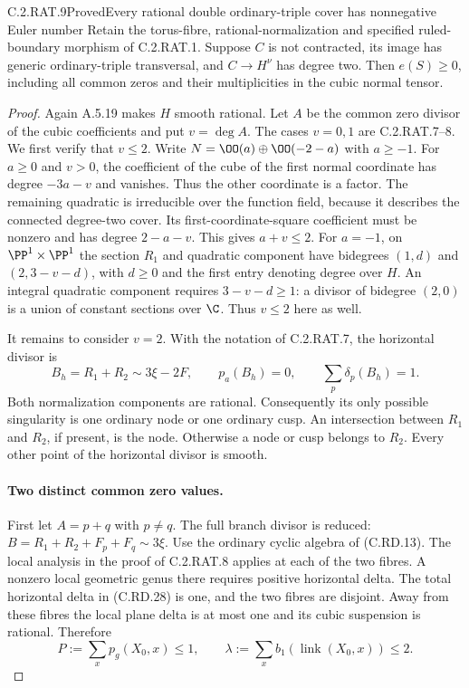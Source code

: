 \begin{statement}{C.2.RAT.9}{Proved}{Every rational double ordinary-triple cover has nonnegative Euler number}
Retain the torus-fibre, rational-normalization and specified
ruled-boundary morphism of C.2.RAT.1. Suppose $C$ is not
contracted, its image has generic ordinary-triple transversal,
and $C\to H^\nu$ has degree two. Then $e(S)\ge0$,
including all common zeros and their multiplicities in
the cubic normal tensor.
\end{statement}
\begin{proof}
Again A.5.19 makes $H$ smooth rational. Let $A$ be the
common zero divisor of the cubic coefficients and put
$v=\deg A$. The cases $v=0,1$ are C.2.RAT.7--8.
We first verify that $v\le2$. Write
$N=\OO(a)\oplus\OO(-2-a)$ with $a\ge-1$.
For $a\ge0$ and $v>0$, the coefficient of the cube
of the first normal coordinate has degree $-3a-v$
and vanishes. Thus the other coordinate is a factor.
The remaining quadratic is irreducible over the
function field, because it describes the connected
degree-two cover. Its first-coordinate-square
coefficient must be nonzero and has degree
$2-a-v$. This gives $a+v\le2$.
For $a=-1$, on $\PP^1\times\PP^1$ the section
$R_1$ and quadratic component have bidegrees
$(1,d)$ and $(2,3-v-d)$, with $d\ge0$ and the
first entry denoting degree over $H$. An integral
quadratic component requires $3-v-d\ge1$:
a divisor of bidegree $(2,0)$ is a union of
constant sections over $\C$. Thus $v\le2$ here
as well.

It remains to consider $v=2$. With the notation
of C.2.RAT.7, the horizontal divisor is
\[
 B_h=R_1+R_2\sim3\xi-2F,
       \qquad p_a(B_h)=0,
       \qquad \sum_p\delta_p(B_h)=1.
\tag{C.RD.28}
\]
Both normalization components are rational.
Consequently its only possible singularity is
one ordinary node or one ordinary cusp. An
intersection between $R_1$ and $R_2$, if present,
is the node. Otherwise a node or cusp belongs
to $R_2$. Every other point of the horizontal
divisor is smooth.

\paragraph{Two distinct common zero values.}
First let $A=p+q$ with $p\ne q$. The full branch
divisor is reduced:
$B=R_1+R_2+F_p+F_q\sim3\xi$.
Use the ordinary cyclic algebra of (C.RD.13).
The local analysis in the proof of C.2.RAT.8
applies at each of the two fibres. A nonzero
local geometric genus there requires positive
horizontal delta. The total horizontal delta
in (C.RD.28) is one, and the two fibres are
disjoint. Away from these fibres the local
plane delta is at most one and its cubic
suspension is rational. Therefore
\[
 P:=\sum_x p_g(X_0,x)\le1,\qquad
 \lambda:=\sum_x b_1(\operatorname{link}(X_0,x))\le2.
\tag{C.RD.29}
\]


\end{proof}
